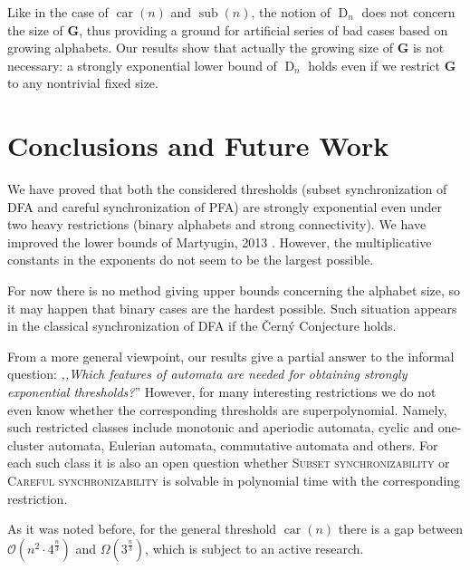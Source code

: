 \documentclass{ws-ijmpc}
\newcommand{\noun}[1]{\textsc{#1}}
\DeclareMathOperator{\D}{D}
\DeclareMathOperator{\car}{car}
\DeclareMathOperator{\sub}{sub}
\begin{document}
Like in the case of $\car\!\left(n\right)$ and $\sub\!\left(n\right)$,
the notion of $\D_{n}$ does not concern the size of $\mathbf{G}$,
thus providing a ground for artificial series of bad cases based on
growing alphabets. Our results show that actually the growing size
of $\mathbf{G}$ is not necessary: a strongly exponential lower bound
of $\D_{n}$ holds even if we restrict $\mathbf{G}$ to any nontrivial
fixed size.


\section{Conclusions and Future Work\label{sec:Conclusions-and-future}}

We have proved that both the considered thresholds (subset synchronization
of DFA and careful synchronization of PFA) are strongly exponential
even under two heavy restrictions (binary alphabets and strong connectivity).
We have improved the lower bounds of Martyugin, 2013 \citep{MAR5}.
However, the multiplicative constants in the exponents do not seem
to be the largest possible. 

For now there is no method giving upper bounds concerning the alphabet
size, so it may happen that binary cases are the hardest possible.
Such situation appears in the classical synchronization of DFA if
the \v{C}ern\'{y} Conjecture holds. 

From a more general viewpoint, our results give a partial answer to
the informal question: \emph{,,Which features of automata are needed
for obtaining strongly exponential thresholds?}'' However, for many
interesting restrictions we do not even know whether the corresponding
thresholds are superpolynomial. Namely, such restricted classes include
monotonic and aperiodic automata, cyclic and one-cluster automata,
Eulerian automata, commutative automata and others. For each such
class it is also an open question whether \noun{Subset synchronizability
}or \noun{Careful synchronizability }is solvable in polynomial time
with the corresponding restriction.

As it was noted before, for the general threshold $\car\!\left(n\right)$
there is a gap between $\mathcal{O}\!\left(n^{2}\cdot4^{\frac{n}{3}}\right)$
and $\Omega\!\left(3^{\frac{n}{3}}\right)$, which is subject to an
active research.



\end{document}
